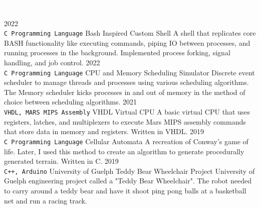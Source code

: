 \documentclass[9pt]{src/developercv} %
\begin{document}
\colorbox{sky700}{\textcolor{white}{\LARGE\MakeUppercase{\textbf{Projects}}}}\\%
\begin{entrylist}
	\entry
		{2022\\
		\small{\texttt{C Programming Language}}}
		{Bash Inspired Custom Shell}
		{}
		{A shell that replicates core BASH functionality like executing commands, piping IO between processes, and running processes in the background. Implemented process forking, signal handling, and job control.}
	\entry
		{2022\\
		\small{\texttt{C Programming Language}}}
		{CPU and Memory Scheduling Simulator}
		{}
		{Discrete event scheduler to manage threads and processes using various scheduling algorithms. The Memory scheduler kicks processes in and out of memory in the method of choice between scheduling algorithms.}
	\entry
		{2021\\
		\small{\texttt{VHDL, MARS MIPS Assembly}}}
		{VHDL Virtual CPU}
		{}
		{A basic virtual CPU that uses registers, latches, and multiplexers to execute Mars MIPS assembly commands that store data in memory and registers. Written in VHDL.}
	\entry
		{2019\\
		\small{\texttt{C Programming Language}}}
		{Cellular Automata}
		{}
		{A recreation of Conway's game of life. Later, I used this method to create an algorithm to generate procedurally generated terrain. Written in C.}
	\entry
		{2019\\
		\small{\texttt{C++, Arduino}}}
		{University of Guelph Teddy Bear Wheelchair Project}
		{}
		{University of Guelph engineering project called a "Teddy Bear Wheelchair". The robot needed to carry around a teddy bear and have it shoot ping pong balls at a basketball net and run a racing track.}
\end{entrylist}
	
\end{document}
